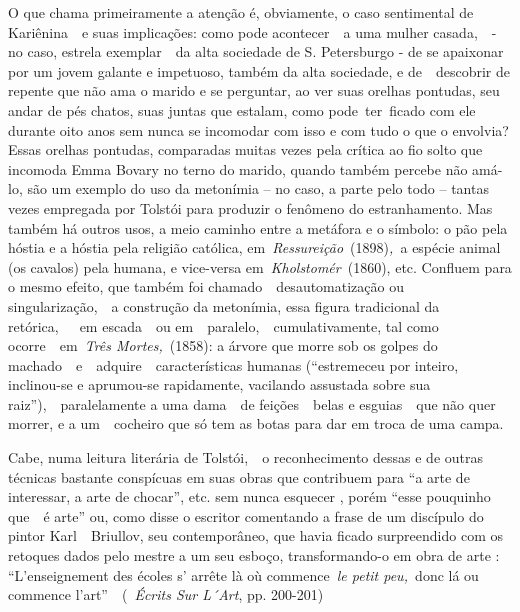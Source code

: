 O que chama primeiramente a atenção é, obviamente, o caso sentimental de
Kariênina~~e suas implicações: como pode acontecer~~a uma mulher
casada,~~- no caso, estrela exemplar~~da alta sociedade de S.
Petersburgo - de se apaixonar por um jovem galante e impetuoso, também
da alta sociedade, e de~~descobrir de repente que não ama o marido e se
perguntar, ao ver suas orelhas pontudas, seu andar de pés chatos, suas
juntas que estalam, como pode~ter~ficado com ele durante oito anos sem
nunca se incomodar com isso e com tudo o que o envolvia? Essas orelhas
pontudas, comparadas muitas vezes pela crítica ao fio solto que incomoda
Emma Bovary no terno do marido, quando também percebe não amá-lo, são um
exemplo do uso da metonímia -- no caso, a parte pelo todo -- tantas
vezes empregada por Tolstói para produzir o fenômeno do estranhamento.
Mas também há outros usos, a meio caminho entre a metáfora e o símbolo:
o pão pela hóstia e a hóstia pela religião católica,
em~\emph{Ressureição}~(1898)\emph{,~}a espécie animal (os cavalos) pela
humana, e vice-versa em~\emph{Kholstomér}~(1860), etc. Confluem para o
mesmo efeito, que também foi chamado~~desautomatização ou
singularização,~~a construção da metonímia, essa figura tradicional da
retórica,~~~em escada~~ou em~~paralelo,~~cumulativamente, tal como
ocorre~~em~\emph{Três Mortes,}~(1858): a árvore que morre sob os golpes
do machado~~e~~adquire~~características humanas (``estremeceu por
inteiro, inclinou-se e aprumou-se rapidamente, vacilando assustada sobre
sua raiz''),~~paralelamente a uma dama~~de feições~~belas e esguias~~que
não quer morrer, e a um~~cocheiro que só tem as botas para dar em troca
de uma campa.

Cabe, numa leitura literária de Tolstói,~~o reconhecimento dessas e de
outras técnicas bastante conspícuas em suas obras que contribuem para
``a arte de interessar, a arte de chocar'', etc. sem nunca esquecer ,
porém ``esse pouquinho que~~é arte'' ou, como disse o escritor
comentando a frase de um discípulo do pintor Karl~~Briullov, seu
contemporâneo, que havia ficado surpreendido com os retoques dados pelo
mestre a um seu esboço, transformando-o em obra de arte :
``L'enseignement des écoles s' arrête là où commence~\emph{le petit
peu,~}donc lá ou commence l'art''~~(~\emph{Écrits Sur L´Art}, pp.
200-201)

~


